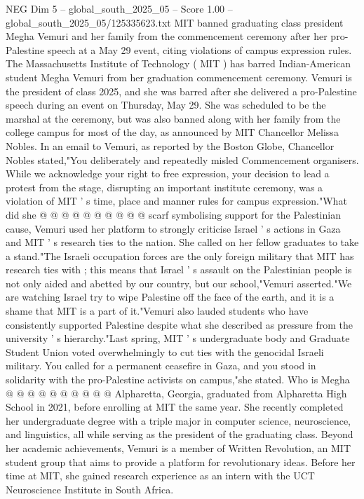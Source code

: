 \begin{textsample}{NEG Dim 5 – global\_south\_2025\_05 – Score 1.00 – global\_south\_2025\_05/125335623.txt}  \label{ex:f5_neg_332}
MIT banned graduating class president Megha Vemuri and her family from the commencement ceremony after her pro-Palestine speech at a May 29 event, citing violations of campus expression rules.
The Massachusetts Institute of Technology ( MIT ) has barred Indian-American student Megha Vemuri from her graduation commencement ceremony.
Vemuri is the president of class 2025, and she was barred after she delivered a pro-Palestine speech during an event on Thursday, May 29.
She was scheduled to be the marshal at the ceremony, but was also banned along with her family from the college campus for most of the day, as announced by MIT Chancellor Melissa Nobles.
In an email to Vemuri, as reported by the Boston Globe, Chancellor Nobles stated,"You deliberately and repeatedly misled Commencement organisers.
While we acknowledge your right to free expression, your decision to lead a protest from the stage, disrupting an important institute ceremony, was a violation of MIT ' s time, place and manner rules for campus expression."What did she @ @ @ @ @ @ @ @ @ @ scarf symbolising support for the Palestinian cause, Vemuri used her platform to strongly criticise Israel ' s actions in Gaza and MIT ' s research ties to the nation.
She called on her fellow graduates to take a stand."The Israeli occupation forces are the only foreign military that MIT has research ties with ; this means that Israel ' s assault on the Palestinian people is not only aided and abetted by our country, but our school,"Vemuri asserted."We are watching Israel try to wipe Palestine off the face of the earth, and it is a shame that MIT is a part of it."Vemuri also lauded students who have consistently supported Palestine despite what she described as pressure from the university ' s hierarchy."Last spring, MIT ' s undergraduate body and Graduate Student Union voted overwhelmingly to cut ties with the genocidal Israeli military.
You called for a permanent ceasefire in Gaza, and you stood in solidarity with the pro-Palestine activists on campus,"she stated.
Who is Megha @ @ @ @ @ @ @ @ @ @ Alpharetta, Georgia, graduated from Alpharetta High School in 2021, before enrolling at MIT the same year.
She recently completed her undergraduate degree with a triple major in computer science, neuroscience, and linguistics, all while serving as the president of the graduating class.
Beyond her academic achievements, Vemuri is a member of Written Revolution, an MIT student group that aims to provide a platform for revolutionary ideas.
Before her time at MIT, she gained research experience as an intern with the UCT Neuroscience Institute in South Africa.

\end{textsample}
